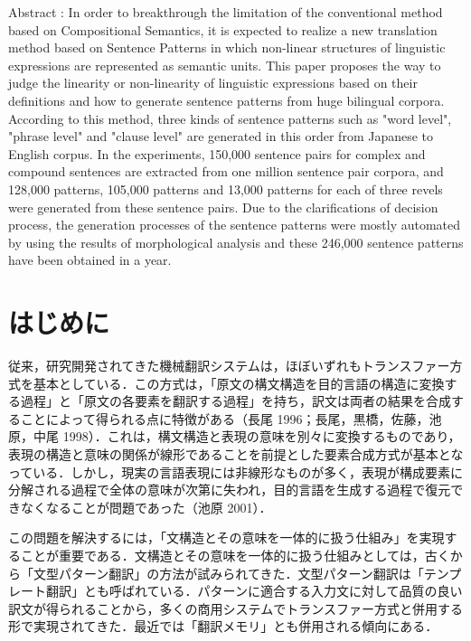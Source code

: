 \documentclass{nlp}
\begin{document}
\begin{eabstract}
Abstract : In order to breakthrough the limitation of the conventional method based on Compositional Semantics, it is expected to realize a new translation method based on Sentence Patterns in which non-linear structures of linguistic expressions are represented as semantic units. This paper proposes the way to judge the linearity or non-linearity of linguistic expressions based on their definitions and how to generate sentence patterns from huge bilingual corpora. According to this method, three kinds of sentence patterns such as "word level", "phrase level" and "clause level" are generated in this order from Japanese to English corpus. In the experiments, 150,000 sentence pairs for complex and compound sentences are extracted from one million sentence pair corpora, and 128,000 patterns, 105,000 patterns and 13,000 patterns for each of three revels were generated from these sentence pairs. Due to the clarifications of decision process, the generation processes of the sentence patterns were mostly automated by using the results of morphological analysis and these 246,000 sentence patterns have been obtained in a year.
\end{eabstract}


\maketitle


\section{はじめに}

従来，研究開発されてきた機械翻訳システムは，ほぼいずれもトランスファー方式を基本としている．この方式は，「原文の構文構造を目的言語の構造に変換する過程」と「原文の各要素を翻訳する過程」を持ち，訳文は両者の結果を合成することによって得られる点に特徴がある（長尾 1996；長尾，黒橋，佐藤，池原，中尾 1998）．これは，構文構造と表現の意味を別々に変換するものであり，表現の構造と意味の関係が線形であることを前提とした要素合成方式が基本となっている．しかし，現実の言語表現には非線形なものが多く，表現が構成要素に分解される過程で全体の意味が次第に失われ，目的言語を生成する過程で復元できなくなることが問題であった（池原 2001）．

この問題を解決するには，「文構造とその意味を一体的に扱う仕組み」を実現することが重要である．文構造とその意味を一体的に扱う仕組みとしては，古くから「文型パターン翻訳」の方法が試みられてきた．文型パターン翻訳は「テンプレート翻訳」とも呼ばれている．パターンに適合する入力文に対して品質の良い訳文が得られることから，多くの商用システムでトランスファー方式と併用する形で実現されてきた．最近では「翻訳メモリ」とも併用される傾向にある．
\end{document}
